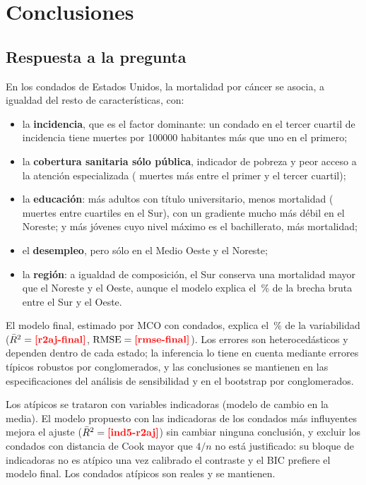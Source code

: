 \chapter{Conclusiones}\label{cap:conclusiones}

\section{Respuesta a la pregunta}

En los condados de Estados Unidos, la mortalidad por cáncer se asocia, a igualdad del resto de
características, con:
\begin{itemize}
  \item la \textbf{incidencia}, que es el factor dominante: un condado en el tercer cuartil de
  incidencia tiene  muertes por \num{100000} habitantes más que uno en el
  primero;
  \item la \textbf{cobertura sanitaria sólo pública}, indicador de pobreza y peor acceso a la
  atención especializada ( muertes más entre el primer y el tercer cuartil);
  \item la \textbf{educación}: más adultos con título universitario, menos mortalidad
  ( muertes entre cuartiles en el Sur), con un gradiente mucho más débil en
  el Noreste; y más jóvenes cuyo nivel máximo es el bachillerato, más mortalidad;
  \item el \textbf{desempleo}, pero sólo en el Medio Oeste y el Noreste;
  \item la \textbf{región}: a igualdad de composición, el Sur conserva una mortalidad mayor que el
  Noreste y el Oeste, aunque el modelo explica el \,\% de la brecha bruta
  entre el Sur y el Oeste.
\end{itemize}

El modelo final, estimado por MCO con  condados, explica el \,\% de
la variabilidad ($\bar R^2=\res{r2aj-final}$, $\mathrm{RMSE}=\res{rmse-final}$). Los errores son
heterocedásticos y dependen dentro de cada estado; la inferencia lo tiene en cuenta mediante
errores típicos robustos por conglomerados, y las conclusiones se mantienen en las
 especificaciones del análisis de sensibilidad y en el bootstrap por
conglomerados.

Los atípicos se trataron con variables indicadoras (modelo de cambio en la media). El modelo
propuesto con las indicadoras de los  condados más influyentes mejora el ajuste
($\bar R^2=\res{ind5-r2aj}$) sin cambiar ninguna conclusión, y excluir los  condados
con distancia de Cook mayor que $4/n$ no está justificado: su bloque de indicadoras no es atípico
una vez calibrado el contraste y el BIC prefiere el modelo final. Los condados atípicos son
reales y se mantienen.

